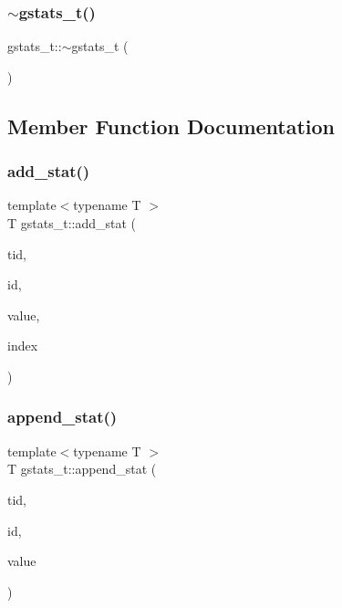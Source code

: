 \subsubsection{\texorpdfstring{$\sim$gstats\+\_\+t()}{~gstats\_t()}}
{\footnotesize\ttfamily gstats\+\_\+t\+::$\sim$gstats\+\_\+t (\begin{DoxyParamCaption}{ }\end{DoxyParamCaption})\hspace{0.3cm}{\ttfamily [inline]}}



\subsection{Member Function Documentation}
\mbox{\label{classgstats__t_a2b601cbf9e9e71bd35ccf033c7cf2d47}} 
\subsubsection{\texorpdfstring{add\+\_\+stat()}{add\_stat()}}
{\footnotesize\ttfamily template$<$typename T $>$ \\
T gstats\+\_\+t\+::add\+\_\+stat (\begin{DoxyParamCaption}\item[{const int}]{tid,  }\item[{const \hyperlink{gstats_8h_a662beb90f6d56f5ee9df4d812d39aa33}{gstats\+\_\+stat\+\_\+id}}]{id,  }\item[{T}]{value,  }\item[{const int}]{index }\end{DoxyParamCaption})\hspace{0.3cm}{\ttfamily [inline]}}

\mbox{\label{classgstats__t_a448015c63c37f2d98f7026f2eb1454a1}} 
\subsubsection{\texorpdfstring{append\+\_\+stat()}{append\_stat()}}
{\footnotesize\ttfamily template$<$typename T $>$ \\
T gstats\+\_\+t\+::append\+\_\+stat (\begin{DoxyParamCaption}\item[{const int}]{tid,  }\item[{const \hyperlink{gstats_8h_a662beb90f6d56f5ee9df4d812d39aa33}{gstats\+\_\+stat\+\_\+id}}]{id,  }\item[{T}]{value }\end{DoxyParamCaption})\hspace{0.3cm}{\ttfamily [inline]}}

